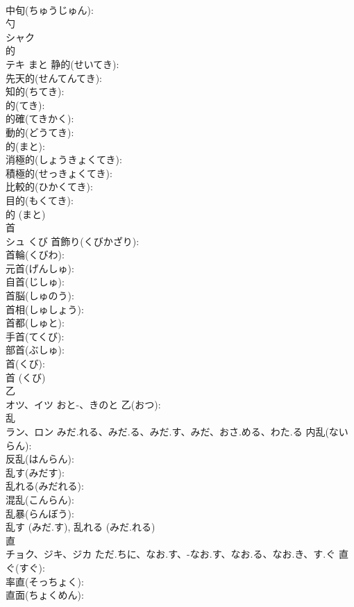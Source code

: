 \documentclass[8pt]{extreport}
\begin{document}
\begin{CJK}{UTF8}{min}
\\	中旬(ちゅうじゅん): 
\\	勺			
\\	シャク			
\\	的			
\\	テキ	まと	静的(せいてき): 
\\	先天的(せんてんてき): 
\\	知的(ちてき): 
\\	的(てき): 
\\	的確(てきかく): 
\\	動的(どうてき): 
\\	的(まと): 
\\	消極的(しょうきょくてき): 
\\	積極的(せっきょくてき): 
\\	比較的(ひかくてき): 
\\	目的(もくてき): 
\\	的 (まと)
\\	首			
\\	シュ	くび	首飾り(くびかざり): 
\\	首輪(くびわ): 
\\	元首(げんしゅ): 
\\	自首(じしゅ): 
\\	首脳(しゅのう): 
\\	首相(しゅしょう): 
\\	首都(しゅと): 
\\	手首(てくび): 
\\	部首(ぶしゅ): 
\\	首(くび): 
\\	首 (くび)
\\	乙			
\\	オツ、イツ	おと-、きのと	乙(おつ): 
\\	乱			
\\	ラン、ロン	みだ.れる、みだ.る、みだ.す、みだ、おさ.める、わた.る	内乱(ないらん): 
\\	反乱(はんらん): 
\\	乱す(みだす): 
\\	乱れる(みだれる): 
\\	混乱(こんらん): 
\\	乱暴(らんぼう): 
\\	乱す (みだ.す), 乱れる (みだ.れる)
\\	直			
\\	チョク、ジキ、ジカ	ただ.ちに、なお.す、-なお.す、なお.る、なお.き、す.ぐ	直ぐ(すぐ): 
\\	率直(そっちょく): 
\\	直面(ちょくめん): 

\end{CJK}
\end{document}
